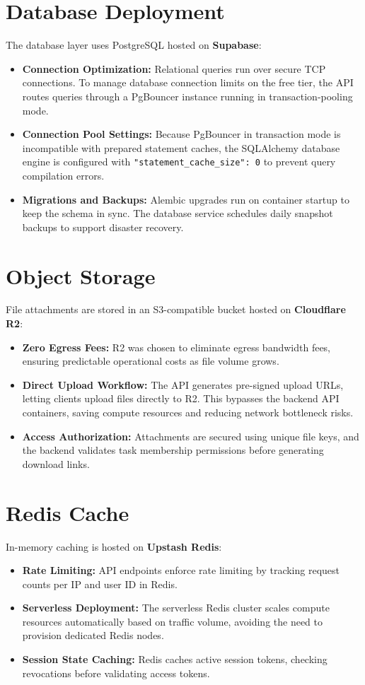 \section{Database Deployment}
The database layer uses PostgreSQL hosted on \textbf{Supabase}:
\begin{itemize}
    \item \textbf{Connection Optimization:} Relational queries run over secure TCP connections. To manage database connection limits on the free tier, the API routes queries through a PgBouncer instance running in transaction-pooling mode.
    \item \textbf{Connection Pool Settings:} Because PgBouncer in transaction mode is incompatible with prepared statement caches, the SQLAlchemy database engine is configured with \texttt{"statement\_cache\_size": 0} to prevent query compilation errors.
    \item \textbf{Migrations and Backups:} Alembic upgrades run on container startup to keep the schema in sync. The database service schedules daily snapshot backups to support disaster recovery.
\end{itemize}

\section{Object Storage}
File attachments are stored in an S3-compatible bucket hosted on \textbf{Cloudflare R2}:
\begin{itemize}
    \item \textbf{Zero Egress Fees:} R2 was chosen to eliminate egress bandwidth fees, ensuring predictable operational costs as file volume grows.
    \item \textbf{Direct Upload Workflow:} The API generates pre-signed upload URLs, letting clients upload files directly to R2. This bypasses the backend API containers, saving compute resources and reducing network bottleneck risks.
    \item \textbf{Access Authorization:} Attachments are secured using unique file keys, and the backend validates task membership permissions before generating download links.
\end{itemize}

\section{Redis Cache}
In-memory caching is hosted on \textbf{Upstash Redis}:
\begin{itemize}
    \item \textbf{Rate Limiting:} API endpoints enforce rate limiting by tracking request counts per IP and user ID in Redis.
    \item \textbf{Serverless Deployment:} The serverless Redis cluster scales compute resources automatically based on traffic volume, avoiding the need to provision dedicated Redis nodes.
    \item \textbf{Session State Caching:} Redis caches active session tokens, checking revocations before validating access tokens.
\end{itemize}

